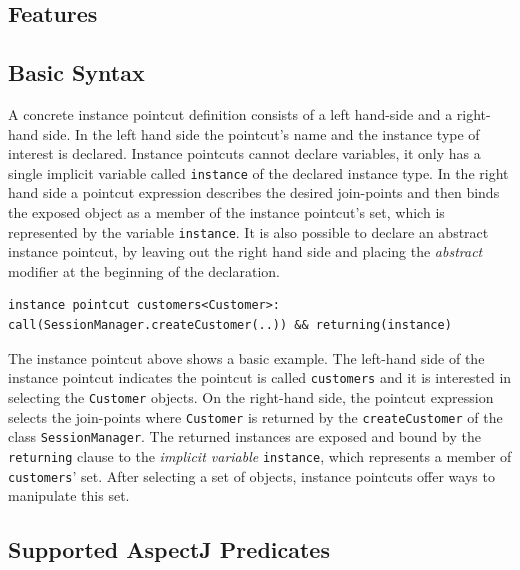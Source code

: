 \documentclass{llncs}
\begin{document}

\subsection{Features}

\subsection{Basic Syntax}

A concrete instance pointcut definition consists of a left hand-side and a right-hand side. In the left hand side the pointcut's name and the instance type of interest is declared. Instance pointcuts cannot declare variables, it only has a single implicit variable called \texttt{instance} of the declared instance type. In the right hand side a pointcut expression describes the desired join-points and then binds the exposed object as a member of the instance pointcut's set, which is represented by the variable \texttt{instance}.  It is also possible to declare an abstract instance pointcut, by leaving out the right hand side and placing the \emph{abstract} modifier at the beginning of the declaration.

\begin{lstlisting}[float=h!]
instance pointcut customers<Customer>: call(SessionManager.createCustomer(..)) && returning(instance)
\end{lstlisting}

The instance pointcut above shows a basic example. The left-hand side of the instance pointcut indicates the pointcut is called \texttt{customers} and it is interested in selecting the \texttt{Customer} objects. On the right-hand side, the pointcut expression selects the join-points where \texttt{Customer} is returned by the \texttt{createCustomer} of the class \texttt{SessionManager}. The returned instances are exposed and bound by the \texttt{returning} clause to the \emph{implicit variable} \texttt{instance}, which represents a member of \texttt{customers}' set. After selecting a set of objects, instance pointcuts offer ways to manipulate this set. 


\subsection{Supported AspectJ Predicates}

\end{document}
